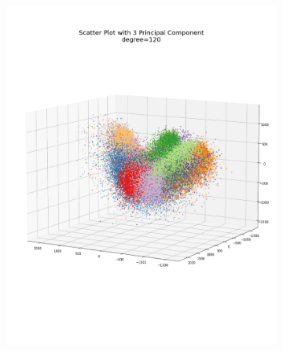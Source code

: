 \documentclass[12pt, a4paper]{article}
\begin{document}
\begin{figure}[h]
\begin{subfigure}{0.3\linewidth}
        \includegraphics[width=\linewidth]{images/q4/a/projection_to_3d_with_angle120.png}
    \end{subfigure}
    \newline
    \begin{subfigure}{0.3\linewidth}
        \centering

\end{subfigure}
\end{figure}
\end{document}
